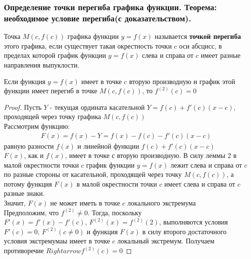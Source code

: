 \documentclass[10pt]{article}
\begin{document}
    \subsubsection{Определение точки перегиба графика функции. Теорема: необходимое условие перегиба(с доказательством).}
    \begin{definition}
        Точка $M(c, f(c))$ графика функции $y = f(x)$ называется \textbf{точкой перегиба} этого графика, если существует такая окрестность точки $c$ оси абсцисс, в пределах которой график функции $y = f(x)$ слева и справа от $c$ имеет разные направления выпуклости.
    \end{definition}
    \begin{theorem}
        Если функция $y = f(x)$ имеет в точке $c$ вторую производную и график этой функции имеет перегиб в точке $M(c, f(c))$, то $f^{(2)}(c) = 0$
    \end{theorem}
    \begin{proof}
        Пусть $Y$ - текущая ордината касательной $Y=f(c)+f'(c)(x-c)$, проходящей через точку графика $M(c, f(c))$\\
        Рассмотрим функцию:
        \begin{gather*}
            F(x)=f(x) - Y = f(x) - f(c) - f'(c)(x-c)
        \end{gather*}
        равную разности $f(x)$ и линейной функции $f(c)+f'(c)(x-c)$\\
        $F(x)$, как и $f(x)$, имеет в точке $с$ вторую производную. В силу леммы 2 в малой окрестности точки $c$ график функции $y = f(x)$ лежит слева и справа от $c$ по разные стороны от касательной, проходящей через точку $M(c, f(c))$, а потому функция $F(x)$ в малой окрестности точки $c$ имеет слева и справа от $c$ разные знаки.\\
        Значит, $F(x)$ не может иметь в точке $c$ локального экстремума\\
        Предположим, что $f^{(2)} \neq 0$. Тогда, поскольку $F'(x) = f'(x) - f'(c),\, F^{(2)}(x) = f^{(2)}(2)$, выполняются условия $F'(c) = 0,\,F^{(2)}(c \neq 0)$ и функция $F(x)$ в силу второго достаточного условия экстремумаы имеет в точке $c$ локальный экстремум. Получаем противоречие $Rightarrow f^{(2)}(c) = 0$ 
    \end{proof}
\end{document}
